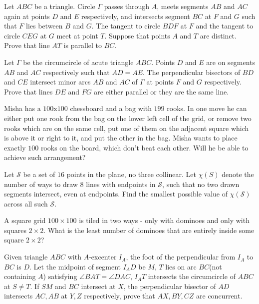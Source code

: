 \documentclass[11pt]{scrartcl}
\begin{document}
\begin{problem}[797215984506934]
	Let $ABC$ be a triangle. Circle $\Gamma$ passes through $A$, meets segments $AB$ and $AC$ again at points $D$ and $E$ respectively, and intersects segment $BC$ at $F$ and $G$ such that $F$ lies between $B$ and $G$. The tangent to circle $BDF$ at $F$ and the tangent to circle $CEG$ at $G$ meet at point $T$. Suppose that points $A$ and $T$ are distinct. Prove that line $AT$ is parallel to $BC$.
\end{problem}
\begin{problem}[625002281186392279]
	Let $\Gamma$ be the circumcircle of acute triangle $ABC$. Points $D$ and $E$ are on segments $AB$ and $AC$ respectively such that $AD = AE$. The perpendicular bisectors of $BD$ and $CE$ intersect minor arcs $AB$ and $AC$ of $\Gamma$ at points $F$ and $G$ respectively. Prove that lines $DE$ and $FG$ are either parallel or they are the same line.
\end{problem}
\begin{problem}[614247648874042]
Misha has a $100$x$100$ chessboard and a bag with $199$ rooks. In one move he can either put one rook from the bag on the lower left cell of the grid, or remove two rooks which are on the same cell, put one of them on the adjacent square which is above it or right to it, and put the other in the bag. Misha wants to place exactly $100$ rooks on the board, which don't beat each other. Will he be able to achieve such arrangement?
\end{problem}
\begin{problem}[711016608896725]
Let $\mathcal S$ be a set of $16$ points in the plane, no three collinear. Let $\chi(S)$ denote the number of ways to draw $8$ lines with endpoints in $\mathcal S$, such that no two drawn segments intersect, even at endpoints. Find the smallest possible value of $\chi(\mathcal S)$ across all such $\mathcal S$.
\end{problem}
\begin{problem}[799773800583372]
	A square grid $100 \times 100$ is tiled in two ways - only with dominoes and only with squares $2 \times 2$. What is the least number of dominoes that are entirely inside some square $2 \times 2$?
\end{problem}
\begin{problem}[5835156231907738776]
Given triangle $ABC$ with $A$-excenter $I_A$, the foot of the perpendicular from $I_A$ to $BC$ is $D$. Let the midpoint of segment $I_AD$ be $M$, $T$ lies on arc $BC$(not containing $A$) satisfying $\angle BAT=\angle DAC$, $I_AT$ intersects the circumcircle of $ABC$ at $S\neq T$. If $SM$ and $BC$ intersect at $X$, the perpendicular bisector of $AD$ intersects $AC,AB$ at $Y,Z$ respectively, prove that $AX,BY,CZ$ are concurrent.
\end{problem}
\end{document}
